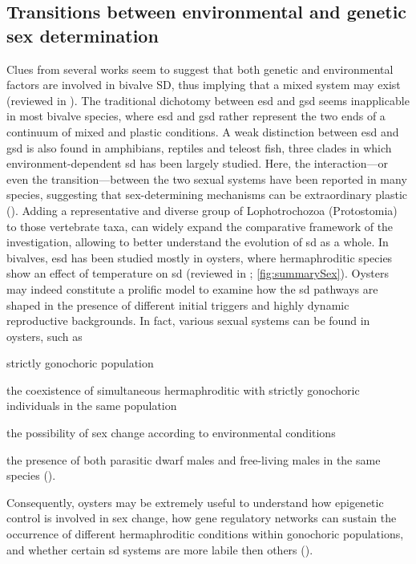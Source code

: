 \subsection{Transitions between environmental and genetic sex determination}
Clues from several works seem to suggest that both genetic and environmental factors are involved in bivalve SD, thus implying that a mixed system may exist (reviewed in ). The traditional dichotomy between \gls{esd} and \gls{gsd} seems inapplicable in most bivalve species, where \gls{esd} and \gls{gsd} rather represent the two ends of a continuum of mixed and plastic conditions.  A weak distinction between \gls{esd} and \gls{gsd} is also found in amphibians, reptiles and teleost fish, three clades in which environment-dependent \gls{sd} has been largely studied. Here, the interaction---or even the transition---between the two sexual systems have been reported in many species, suggesting that sex-determining mechanisms can be extraordinary plastic (). Adding a representative and diverse group of Lophotrochozoa (Protostomia) to those vertebrate taxa, can widely expand the comparative framework of the investigation, allowing to better understand the evolution of \gls{sd} as a whole. In bivalves, \gls{esd} has been studied mostly in oysters, where hermaphroditic species show an effect of temperature on \gls{sd} (reviewed in ; \cref{fig:summarySex}). Oysters may indeed constitute a prolific model to examine how the \gls{sd} pathways are shaped in the presence of different initial triggers and highly dynamic reproductive backgrounds. In fact, various sexual systems can be found in oysters, such as
\begin{inlinelist}[itemjoin={{, }}, itemjoin*={{, and }}]
	\item strictly gonochoric population
	\item the coexistence of simultaneous hermaphroditic with strictly gonochoric individuals in the same population
	\item the possibility of sex change according to environmental conditions
	\item the presence of both parasitic dwarf males and free-living males in the same species ().
\end{inlinelist}
Consequently, oysters may be extremely useful to understand how epigenetic control is involved in sex change, how gene regulatory networks can sustain the occurrence of different hermaphroditic conditions within gonochoric populations, and whether certain \gls{sd} systems are more labile then others ().

